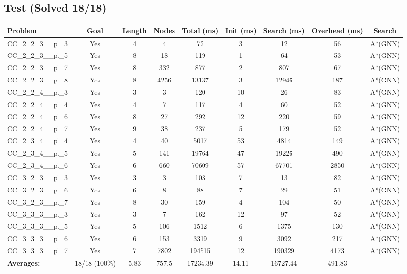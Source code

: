 \documentclass{article}
\begin{document}
\subsection*{Test (Solved 18/18)}
\begin{tabular}{lcccccccc}
\toprule
Problem & Goal & Length & Nodes & Total (ms) & Init (ms) & Search (ms) & Overhead (ms) & Search \\
\midrule
CC\_2\_2\_3\_\_pl\_3 & Yes & 4 & 4 & 72 & 3 & 12 & 56 & A*(GNN) \\
CC\_2\_2\_3\_\_pl\_5 & Yes & 8 & 18 & 119 & 1 & 64 & 53 & A*(GNN) \\
CC\_2\_2\_3\_\_pl\_7 & Yes & 8 & 332 & 877 & 2 & 807 & 67 & A*(GNN) \\
CC\_2\_2\_3\_\_pl\_8 & Yes & 8 & 4256 & 13137 & 3 & 12946 & 187 & A*(GNN) \\
CC\_2\_2\_4\_\_pl\_3 & Yes & 3 & 3 & 120 & 10 & 26 & 83 & A*(GNN) \\
CC\_2\_2\_4\_\_pl\_4 & Yes & 4 & 7 & 117 & 4 & 60 & 52 & A*(GNN) \\
CC\_2\_2\_4\_\_pl\_6 & Yes & 8 & 27 & 292 & 12 & 220 & 59 & A*(GNN) \\
CC\_2\_2\_4\_\_pl\_7 & Yes & 9 & 38 & 237 & 5 & 179 & 52 & A*(GNN) \\
CC\_2\_3\_4\_\_pl\_4 & Yes & 4 & 40 & 5017 & 53 & 4814 & 149 & A*(GNN) \\
CC\_2\_3\_4\_\_pl\_5 & Yes & 5 & 141 & 19764 & 47 & 19226 & 490 & A*(GNN) \\
CC\_2\_3\_4\_\_pl\_6 & Yes & 6 & 660 & 70609 & 57 & 67701 & 2850 & A*(GNN) \\
CC\_3\_2\_3\_\_pl\_3 & Yes & 3 & 3 & 103 & 7 & 13 & 82 & A*(GNN) \\
CC\_3\_2\_3\_\_pl\_6 & Yes & 6 & 8 & 88 & 7 & 29 & 51 & A*(GNN) \\
CC\_3\_2\_3\_\_pl\_7 & Yes & 8 & 30 & 159 & 4 & 104 & 50 & A*(GNN) \\
CC\_3\_3\_3\_\_pl\_3 & Yes & 3 & 7 & 162 & 12 & 97 & 52 & A*(GNN) \\
CC\_3\_3\_3\_\_pl\_5 & Yes & 5 & 106 & 1512 & 6 & 1375 & 130 & A*(GNN) \\
CC\_3\_3\_3\_\_pl\_6 & Yes & 6 & 153 & 3319 & 9 & 3092 & 217 & A*(GNN) \\
CC\_3\_3\_3\_\_pl\_7 & Yes & 7 & 7802 & 194515 & 12 & 190329 & 4173 & A*(GNN) \\
\textbf{Averages:} & 18/18 (100\%) & 5.83 & 757.5 & 17234.39 & 14.11 & 16727.44 & 491.83 & \\
\bottomrule
\end{tabular}
\\[0.7cm]
\end{document}
